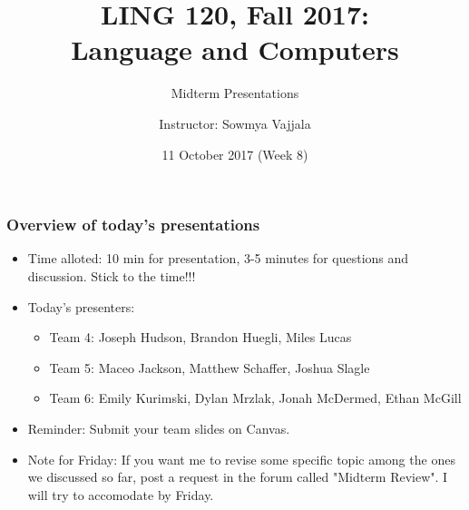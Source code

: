 \documentclass{beamer}
\author[Sowmya Vajjala]{Instructor: Sowmya Vajjala}
\title[LING 120]{LING 120, Fall 2017: \\ Language and Computers}
\subtitle{Midterm Presentations}
\date{11 October 2017 (Week 8)}
\institute{Iowa State University, USA}
\begin{document}
\begin{frame}\titlepage
\end{frame}

\begin{frame}%
\frametitle{Overview of today's presentations}
\begin{itemize}
\item Time alloted: 10 min for presentation, 3-5 minutes for questions and discussion. Stick to the time!!!
\item Today's presenters: 
\begin{itemize}
\item Team 4: Joseph Hudson, Brandon Huegli, Miles Lucas
\item Team 5: Maceo Jackson, Matthew Schaffer, Joshua Slagle
\item Team 6: Emily Kurimski, Dylan Mrzlak, Jonah McDermed, Ethan McGill
\end{itemize}
\item Reminder: Submit your team slides on Canvas. 
\item Note for Friday: If you want me to revise some specific topic among the ones we discussed so far, post a request in the forum called "Midterm Review". I will try to accomodate by Friday. 
\end{itemize}
\end{frame}
 
\end{document}
